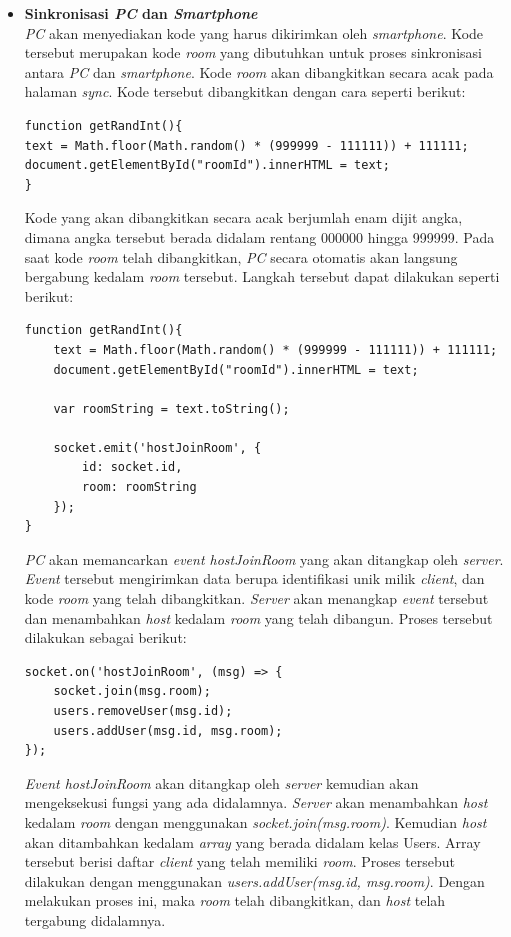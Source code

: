 \begin{enumerate}
\begin{itemize}
		\item \textbf{Sinkronisasi \textit{PC} dan \textit{Smartphone}} \\
		\textit{PC} akan menyediakan kode yang harus dikirimkan oleh \textit{smartphone}. Kode tersebut merupakan kode \textit{room} yang dibutuhkan untuk proses sinkronisasi antara \textit{PC} dan \textit{smartphone}. Kode \textit{room} akan dibangkitkan secara acak pada halaman \textit{sync}. Kode tersebut dibangkitkan dengan cara seperti berikut:
\begin{lstlisting}[caption={Proses membangkitkan kode \textit{room}}, label={lst:bangkit_kode}, captionpos=b]
function getRandInt(){
text = Math.floor(Math.random() * (999999 - 111111)) + 111111;
document.getElementById("roomId").innerHTML = text;
}
\end{lstlisting}
		Kode yang akan dibangkitkan secara acak berjumlah enam dijit angka, dimana angka tersebut berada didalam rentang 000000 hingga 999999. Pada saat kode \textit{room} telah dibangkitkan, \textit{PC} secara otomatis akan langsung bergabung kedalam \textit{room} tersebut. Langkah tersebut dapat dilakukan seperti berikut:
\begin{lstlisting}[caption={Proses \textit{host} bergabung kedalam room}, label={host_gabung}, captionpos=b]
function getRandInt(){
	text = Math.floor(Math.random() * (999999 - 111111)) + 111111;
	document.getElementById("roomId").innerHTML = text;

	var roomString = text.toString();

	socket.emit('hostJoinRoom', {
		id: socket.id,
		room: roomString
	});
}
\end{lstlisting}
		\textit{PC} akan memancarkan \textit{event hostJoinRoom} yang akan ditangkap oleh \textit{server}. \textit{Event} tersebut mengirimkan data berupa identifikasi unik milik \textit{client}, dan kode \textit{room} yang telah dibangkitkan. \textit{Server} akan menangkap \textit{event} tersebut dan menambahkan \textit{host} kedalam \textit{room} yang telah dibangun. Proses tersebut dilakukan sebagai berikut:
\begin{lstlisting}[caption={\textit{Server} menerima \textit{event} dari \textit{host}}, label={lst:server_acc_host}, captionpos=b]
socket.on('hostJoinRoom', (msg) => {
	socket.join(msg.room);
	users.removeUser(msg.id);
	users.addUser(msg.id, msg.room);
});
\end{lstlisting}
		\textit{Event hostJoinRoom} akan ditangkap oleh \textit{server} kemudian akan mengeksekusi fungsi yang ada didalamnya. \textit{Server} akan menambahkan \textit{host} kedalam \textit{room} dengan menggunakan \textit{socket.join(msg.room)}. Kemudian \textit{host} akan ditambahkan kedalam \textit{array} yang berada didalam kelas Users. Array tersebut berisi daftar \textit{client} yang telah memiliki \textit{room}. Proses tersebut dilakukan dengan menggunakan \textit{users.addUser(msg.id, msg.room)}. Dengan melakukan proses ini, maka \textit{room} telah dibangkitkan, dan \textit{host} telah tergabung didalamnya.
		

\end{itemize}
\end{enumerate}
